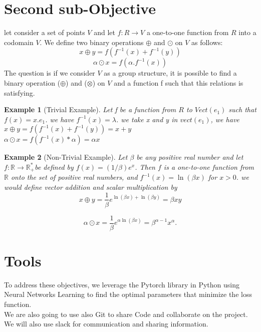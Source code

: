\documentclass{report}
\newtheorem{Example}{Example}
\begin{document}
\section{Second sub-Objective}
	let consider a set of points  $ V $ and let  $ f: R \rightarrow V $ a one-to-one
	function from $R$ into a codomain $V$. We define two binary operations $\oplus$ and $\odot$ on $V$ as follows:
    $$ x \oplus y = f(f^{-1}(x) + f^{-1}(y)) $$
    $$ \alpha \odot x = f(  \alpha.f^{-1}(x)) $$
	The question is if we consider $V$ as a group 
    structure, it is possible to find a binary 
    operation ($\oplus$) and ($\otimes $) on $V$ and a function f 
    such that this relations is satisfying.
    \begin{Example}[Trivial Example]
        Let f be a function from $R$ to $Vect{(e_1)}$ such that $f(x) = x.e_1$.
        we have $f^{-1}(x) = \lambda$.
            we take x and y in $vect{(e_1)}$, we have \\
            $x\oplus y = f(f^{-1}(x) + f^{-1}(y)) = x + y$ \\
            $\alpha \odot x = f(f^{-1}(x) * \alpha) = \alpha x$ 
    \end{Example}
    \begin{Example}[Non-Trivial Example]
        Let $\beta$ be any positive real number and let $f: \mathbb{R} \rightarrow \mathbb{R}_{+}^{*}$be
        defined by $f(x)=(1 / \beta) e^x$. Then $f$ is a one-to-one
        function from $\mathbb{R}$ onto the set of positive real numbers, 
        and $f^{-1}(x)=\ln (\beta x)$ for $x>0$. we would define vector 
        addition and scalar multiplication by
        $$
        x \oplus y=\frac{1}{\beta} e^{\ln (\beta x)+\ln (\beta y)}=\beta x y
        $$ 
        
        $$
        \alpha \odot x=\frac{1}{\beta} e^{\alpha \ln (\beta x)}=\beta^{\alpha-1} x^\alpha.
        $$ 
    \end{Example}
	
\section{Tools}
    To address these objectives, we leverage
    the Pytorch library in Python using Neural Networks Learning to find the optimal parameters that minimize the loss function.\\
    We are also going to use also Git to share Code and collaborate on the project.\\ 
    We will also use slack for communication and sharing information.\\
\end{document}
